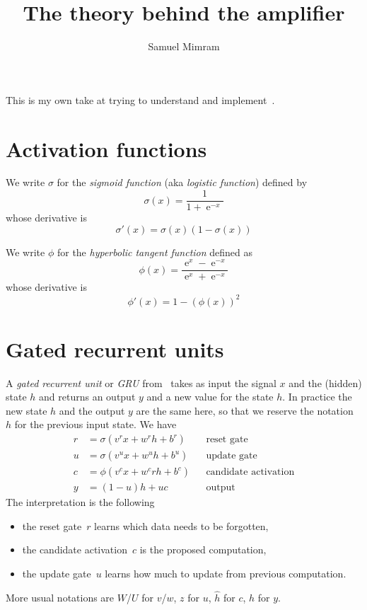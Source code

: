 \documentclass[a4paper]{article}
\title{The theory behind the amplifier}
\author{Samuel Mimram}
\newcommand{\ce}{\operatorname{e}}
\begin{document}
\maketitle

This is my own take at trying to understand and implement~\cite{wright2019real}.

\section{Activation functions}
We write $\sigma$ for the \emph{sigmoid function} (aka \emph{logistic function})
defined by
\[
  \sigma(x) = \frac 1 {1 + \ce^{-x}}
\]
whose derivative is
\[
  \sigma'(x) = \sigma(x)(1-\sigma(x))
\]

We write $\phi$ for the \emph{hyperbolic tangent function} defined as
\[
  \phi(x)=\frac{\ce^{x}-\ce^{-x}}{\ce^{x}+\ce^{-x}}
\]
whose derivative is
\[
  \phi'(x)=1-(\phi(x))^2
\]

\section{Gated recurrent units}
A \emph{gated recurrent unit} or \emph{GRU} from~\cite{cho2014learning} takes as
input the signal $x$ and the (hidden) state $h$ and returns an output $y$ and a
new value for the state $h$. In practice the new state $h$ and the output $y$
are the same here, so that we reserve the notation~$h$ for the previous input
state. We have
\begin{align*}
  r&=\sigma(v^rx+w^rh+b^r)&&\text{reset gate}\\
  u&=\sigma(v^ux+w^uh+b^u)&&\text{update gate}\\
  c&=\phi(v^cx+w^crh+b^c)&&\text{candidate activation}\\
  y&=(1-u)h+uc&&\text{output}
\end{align*}
The interpretation is the following
\begin{itemize}
\item the reset gate~$r$ learns which data needs to be forgotten,
\item the candidate activation~$c$ is the proposed computation,
\item the update gate~$u$ learns how much to update from previous computation.
\end{itemize}
More usual notations are $W$/$U$ for $v$/$w$, $z$ for $u$, $\hat h$ for $c$, $h$
for $y$.
\end{document}
